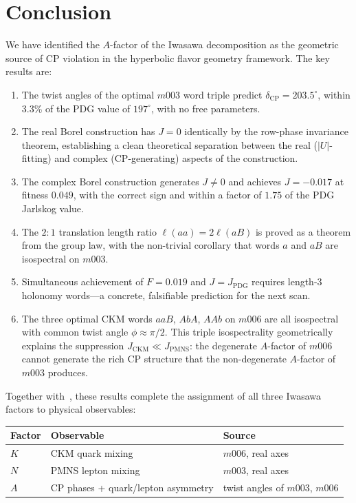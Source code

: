 \documentclass[11pt,a4paper]{article}
\begin{document}
\section{Conclusion}
\label{sec:conclusion}

We have identified the $A$-factor of the Iwasawa decomposition as the
geometric source of CP violation in the hyperbolic flavor geometry
framework.  The key results are:
\begin{enumerate}
  \item The twist angles of the optimal $m003$ word triple predict
    $\delta_{\mathrm{CP}} = 203.5^\circ$, within 3.3\% of the PDG
    value of $197^\circ$, with no free parameters.
  \item The real Borel construction has $J = 0$ identically by the
    row-phase invariance theorem, establishing a clean theoretical
    separation between the real ($|U|$-fitting) and complex
    (CP-generating) aspects of the construction.
  \item The complex Borel construction generates $J \neq 0$ and
    achieves $J = -0.017$ at fitness $0.049$, with the correct sign
    and within a factor of $1.75$ of the PDG Jarlskog value.
  \item The $2\!:\!1$ translation length ratio $\ell(aa) = 2\ell(aB)$
    is proved as a theorem from the group law, with the non-trivial
    corollary that words $a$ and $aB$ are isospectral on $m003$.
  \item Simultaneous achievement of $F = 0.019$ and
    $J = J_{\mathrm{PDG}}$ requires length-3 holonomy words---a
    concrete, falsifiable prediction for the next scan.
  \item The three optimal CKM words $aaB$, $AbA$, $AAb$ on $m006$
    are all isospectral with common twist angle $\phi \approx \pi/2$.
    This triple isospectrality geometrically explains the suppression
    $J_{\mathrm{CKM}} \ll J_{\mathrm{PMNS}}$: the degenerate
    $A$-factor of $m006$ cannot generate the rich CP structure that
    the non-degenerate $A$-factor of $m003$ produces.
\end{enumerate}

Together with~\cite{Gentry2026c,Gentry2026b}, these results complete
the assignment of all three Iwasawa factors to physical observables:

\begin{center}
\begin{tabular}{lll}
\toprule
Factor & Observable & Source \\
\midrule
$K$ & CKM quark mixing           & $m006$, real axes \\
$N$ & PMNS lepton mixing          & $m003$, real axes \\
$A$ & CP phases + quark/lepton asymmetry & twist angles of $m003$, $m006$ \\
\bottomrule
\end{tabular}
\end{center}
\end{document}
